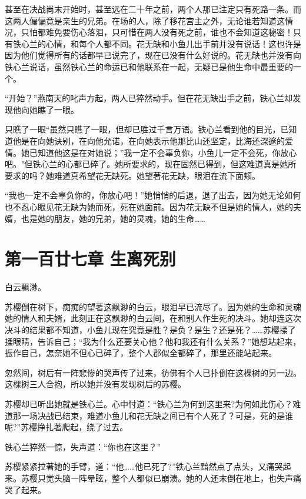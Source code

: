 \documentclass[12pt,oneside]{book}
\begin{document}
甚至在决战尚末开始时，甚至远在二十年之前，两个人那已注定只有死路一条。而这两人偏偏竟是亲生的兄弟。在场的人，除了移花宫主之外，无论谁若知道这情况，只怕都难免要伤心落泪，只可惜在两人没有死之前，谁也不会知道这秘密！只有铁心兰的心情，和每个人都不同。花无缺和小鱼儿出手前并没有说话！这也许是因为他们觉得所有的话都早已说完了，现在已没有什么好说的。花无缺也并没有向铁心兰说话，虽然铁心兰的命运已和他联系在一起，无疑已是他生命中最重要的一个。

``开始？''燕南天的叱声方起，两人已猝然动手。但在花无缺出手之前，铁心兰却发现他向她瞧了一眼。

只瞧了一眼``虽然只瞧了一眼，但却已胜过千言万语。铁心兰看到他的目光，已知道他是在向她诀别，在向他允诺，在向她表示他那比山还坚定，比海还深邃的爱情。她已知道他这是在对她说；''我一定不会辜负你，小鱼儿一定不会死，你放心吧。"但铁心兰的心都已碎了。她所要求的，现在固然已得到，但这难道真是她所要求的吗？她难道真希望花无缺死。她望著花无缺，眼泪在流下面颊。

``我也一定不会辜负你的，你放心吧！''她悄悄的后退，退了出去，因为她无论如何也不忍心眼见花无缺为她而死，死在她面前。因为花无缺不但是她的情人，她的夫婿，也是她的朋友，她的兄弟，她的灵魂，她的生命\ldots\ldots{}

\hypertarget{ux7b2cux4e00ux767eux5effux4e03ux7ae0-ux751fux79bbux6b7bux522b}{%
\chapter{第一百廿七章
生离死别}\label{ux7b2cux4e00ux767eux5effux4e03ux7ae0-ux751fux79bbux6b7bux522b}}

白云飘渺。

苏樱倒在树下，痴痴的望著这飘渺的白云，眼泪早已流尽了。因为她的生命和灵魂她的情人和夫婿，此刻正在这飘渺的白云间，在和别人作生死的决斗。她却连这次决斗的结果都不知道，小鱼儿现在究竟是胜？是负？是生？还是死？\ldots\ldots 苏樱揉了揉眼睛，告诉自己；``我为什么还要关心他？他和我还有什么关系？''她想站起来，振作自己，怎奈她不但心已碎了，整个人郡似全都碎了，那里还能站起来。

忽然间，树后有一阵悲惨的哭声传了过来，彷佛有个人已扑倒在这棵树的另一边。这棵树三人合抱，所以她并没有发现树后的苏樱。

苏樱却已听出她就是铁心兰。心中忖道：``铁心兰为何到这里来?为何如此伤心？难道那一场决战已结束，难道小鱼儿和花无缺之间已有个人死了？可是，死的是谁呢?''苏樱挣扎著爬起，绕了过去。

铁心兰猝然一惊，失声道：``你也在这里？''

苏樱紧紧拉著她的手臂，道：``他\ldots\ldots 他已死了?''铁心兰黯然点了点头，又痛哭起来。苏樱只觉头脑一阵晕眩，整个人都似已崩溃。她的人还末倒在地上，也失声痛哭了起来。
\end{document}

